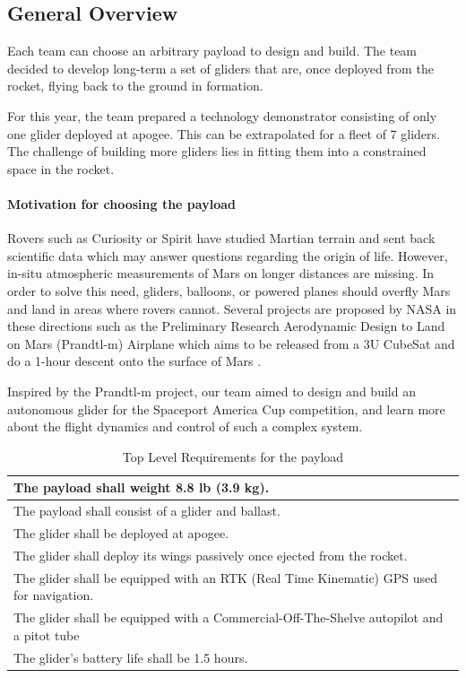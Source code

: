 \subsection{General Overview}

Each team can choose an arbitrary payload to design and build. The team decided to develop long-term a set of gliders that are, once deployed from the rocket, flying back to the ground in formation. 


For this year, the team prepared a technology demonstrator consisting of only one glider deployed at apogee. This can be extrapolated for a fleet of 7 gliders. The challenge of building more gliders lies in fitting them into a constrained space in the rocket. 

\paragraph{Motivation for choosing the payload}
\hfill \break
Rovers such as Curiosity or Spirit have studied Martian terrain and sent back scientific data which may answer questions regarding the origin of life. However, in-situ atmospheric measurements of Mars on longer distances are missing. In order to solve this need, gliders, balloons, or powered planes should overfly Mars and land in areas where rovers cannot. Several projects are proposed by NASA in these directions such as the Preliminary Research Aerodynamic Design to Land on Mars (Prandtl-m) Airplane which aims to be released from a 3U CubeSat and do a 1-hour descent onto the surface of Mars \cite{mars}.

Inspired by the Prandtl-m project, our team aimed to design and build an autonomous glider for the Spaceport America Cup competition, and learn more about the flight dynamics and control of such a complex system.


\begin{table}[h!]
\centering
\begin{tabular}{|p{}|}
\hline
    The payload shall weight 8.8 lb (3.9 kg). \\ \hline
    The payload shall consist of a glider and ballast.  \\ \hline
    The glider shall be deployed at apogee. \\ \hline
    The glider shall deploy its wings passively once ejected from the rocket. \\ \hline
    The glider shall be equipped with an RTK (Real Time Kinematic) GPS used for navigation. \\ \hline
    The glider shall be equipped with a Commercial-Off-The-Shelve autopilot and a pitot tube \\ \hline
    The glider's battery life shall be 1.5 hours. \\ \hline
\end{tabular}
\caption{Top Level Requirements for the payload}
\label{table:se_topLevelR}
\end{table}


